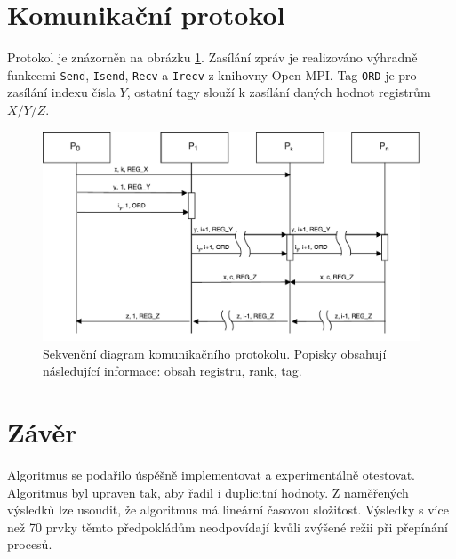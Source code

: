 \documentclass[11pt,a4paper]{article}
\begin{document}
\section{Komunikační protokol}
\label{proto}

Protokol je znázorněn na obrázku \ref{proto_schema}. Zasílání zpráv je realizováno výhradně funkcemi \texttt{Send}, \texttt{Isend}, \texttt{Recv} a \texttt{Irecv} z knihovny Open MPI. Tag \texttt{ORD} je pro zasílání indexu čísla $Y$, ostatní tagy slouží k zasílání daných hodnot registrům $X/Y/Z$.

\begin{figure}[!h]
    \includegraphics[width=0.8\linewidth]{protokol}
    \centering
    \caption{Sekvenční diagram komunikačního protokolu. Popisky obsahují následující informace: obsah registru, rank, tag.}
    \label{proto_schema}
\end{figure}


\section{Závěr}

Algoritmus se podařilo úspěšně implementovat a experimentálně otestovat. Algoritmus byl upraven tak, aby řadil i duplicitní hodnoty. Z naměřených výsledků lze usoudit, že algoritmus má lineární časovou složitost. Výsledky s více než 70 prvky těmto předpokládům neodpovídají kvůli zvýšené režii při přepínání procesů.




\makeatletter
\makeatother

\end{document}
